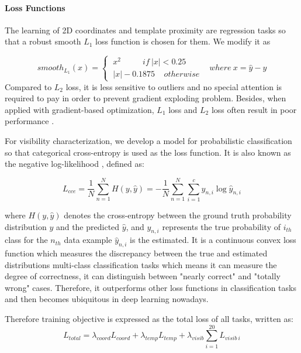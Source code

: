\paragraph{Loss Functions}
\label{loss_functions}
The learning of 2D coordinates and template proximity are regression tasks so that a robust smooth $L_1$ loss function \cite{DBLP:journals/corr/Girshick15} is chosen for them. We modify it as

\begin{equation}
\label{eq10}
smooth_{L_1}(x) =
\begin{cases}
~x^2 ~~~~~~~~~~~~if ~\left | x \right |< 0.25 & \\    
~\left | x \right | - 0.1875 ~~~~~otherwise   
\end{cases} 
where  ~ x=\widehat{y} - y
\end{equation}
Compared to $L_2$ loss, it is less sensitive to outliers and no special attention is required to pay in order to prevent gradient exploding problem\cite{DBLP:journals/corr/Girshick15}. Besides, when applied with gradient-based optimization, $L_1$ loss and $L_2$ loss often result in poor performance \cite{Goodfellow-et-al-2016}.

For visibility characterization, we develop a model for probabilistic classification so that categorical cross-entropy is used as the loss function. It is also known as the negative log-likelihood \cite{Goodfellow-et-al-2016}, defined as:

\begin{equation}
\label{eq11}
L_{cce} =\frac{1}{N} \sum_{n=1}^N H(y,\widehat{y}) = -\frac{1}{N}\sum_{n=1}^N \sum_{i=1}^c y_{n,i} \log \widehat{y}_{n,i}
\end{equation}

where $H(y, \widehat{y})$ denotes the cross-entropy between the ground truth probability distribution $y$ and the predicted $\widehat{y}$, and $y_{n,i} $ represents the true probability of $i_{th}$ class for the $n_{th}$ data example $\widehat{y}_{n,i}$ is the estimated. It is a continuous convex loss function which measures the discrepancy between the true and estimated distributions multi-class classification tasks \cite{DBLP:journals/corr/abs-1802-09941} which means it can measure the degree of correctness, \ie it can distinguish between "nearly correct" and "totally wrong" cases.  Therefore, it outperforms other loss functions in classification tasks and then becomes ubiquitous in deep learning nowadays.

Therefore training objective is expressed as the total loss of all tasks, written as:
\begin{equation}
\label{eq12}
L_{total} = \lambda_{coord} L_{coord} + \lambda_{temp} L_{temp} + \lambda_{visib}\sum_{i=1}^{20} L_{visib~i}
\end{equation}

